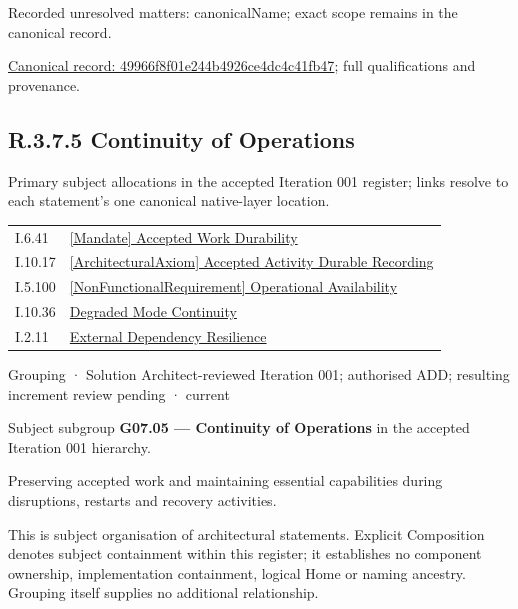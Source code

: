 {\small Recorded unresolved matters: canonicalName; exact scope remains in the canonical record.}\par
{\footnotesize \href{../../../../continuum/grouping/49966f8f01e244b4926ce4dc4c41fb47.md}{Canonical record: 49966f8f01e244b4926ce4dc4c41fb47}; full qualifications and provenance.}\par
\subsection*{R.3.7.5 Continuity of Operations}
\label{navigation:R.3.7.5}

Primary subject allocations in the accepted Iteration 001 register; links resolve to each statement’s one canonical native-layer location.\par
\begin{longtable}{p{.22\linewidth}p{.73\linewidth}}
I.6.41 & \hyperref[element:eabd38371b6940289d9a4bf8e9773942]{[Mandate] Accepted Work Durability} \\
I.10.17 & \hyperref[element:6ee491b8c08d41868c3a7652fb794756]{[ArchitecturalAxiom] Accepted Activity Durable Recording} \\
I.5.100 & \hyperref[element:65ac0367b7f241149ad1839032004039]{[NonFunctionalRequirement] Operational Availability} \\
I.10.36 & \hyperref[element:51191ca802f54efb8554d20423199cd0]{Degraded Mode Continuity} \\
I.2.11 & \hyperref[element:150b3b1eea9b484b89ddc609bf550485]{External Dependency Resilience} \\
\end{longtable}
\label{element:41900f15d1d2431295a4b9dc1aa752c0}
{\small Grouping · Solution Architect-reviewed Iteration 001; authorised ADD; resulting increment review pending · current}\par

Subject subgroup \textbf{G07.05 — Continuity of Operations} in the accepted Iteration 001 hierarchy.



Preserving accepted work and maintaining essential capabilities during disruptions, restarts and recovery activities.



This is subject organisation of architectural statements. Explicit Composition denotes subject containment within this register; it establishes no component ownership, implementation containment, logical Home or naming ancestry. Grouping itself supplies no additional relationship.


